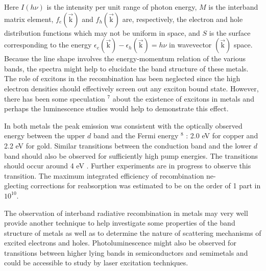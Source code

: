 \documentclass[10pt]{article}
\begin{document}
Here $I(h \nu)$ is the intensity per unit range of photon energy, $M$ is the interband matrix element, $f_{e}(\overrightarrow{\mathrm{k}})$ and $f_{h}(\overrightarrow{\mathrm{k}})$ are, respectively, the electron and hole distribution functions which may not be uniform in space, and $S$ is the surface corresponding to the energy $\epsilon_{e}(\overrightarrow{\mathrm{k}})-\epsilon_{h}(\overrightarrow{\mathrm{k}})=h \nu$ in wavevector $(\overrightarrow{\mathrm{k}})$ space. Because the line shape involves the energy-momentum relation of the various bands, the spectra might help to elucidate the band structure of these metals. The role of excitons in the recombination has been neglected since the high electron densities should effectively screen out any exciton bound state. However, there has been some speculation ${ }^{7}$ about the existence of excitons in metals and perhaps the luminescence studies would help to demonstrate this effect.

In both metals the peak emission was consistent with the optically observed energy between the upper $d$ band and the Fermi energy ${ }^{8}$ : 2.0 eV for copper and 2.2 eV for gold. Similar transitions between the conduction band and the lower $d$ band should also be observed for sufficiently high pump energies. The transitions should occur around 4 eV . Further experiments are in progress to observe this transition. The maximum integrated efficiency of recombination ne-\\
glecting corrections for reabsorption was estimated to be on the order of 1 part in $10^{10}$.

The observation of interband radiative recombination in metals may very well provide another technique to help investigate some properties of the band structure of metals as well as to determine the nature of scattering mechanisms of excited electrons and holes. Photoluminescence might also be observed for transitions between higher lying bands in semiconductors and semimetals and could be accessible to study by laser excitation techniques.
\end{document}
